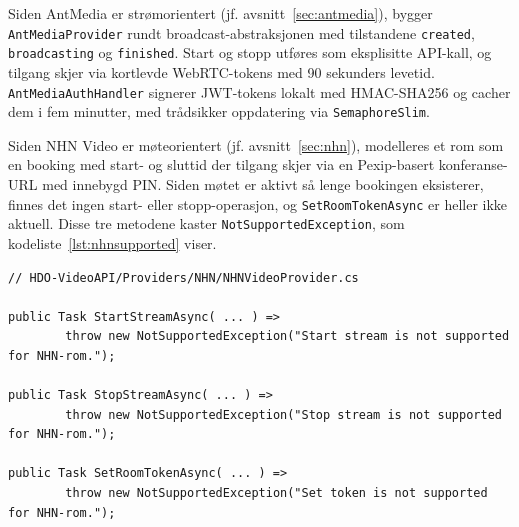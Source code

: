 

Siden AntMedia er strømorientert (jf. avsnitt~\ref{sec:antmedia}), bygger \texttt{AntMediaProvider} rundt broadcast-abstraksjonen med tilstandene \texttt{created}, \texttt{broadcasting} og \texttt{finished}. Start og stopp utføres som eksplisitte API-kall, og tilgang skjer via kortlevde WebRTC-tokens med 90 sekunders levetid. \texttt{AntMediaAuthHandler} signerer JWT-tokens lokalt med HMAC-SHA256 og cacher dem i fem minutter, med trådsikker oppdatering via \texttt{SemaphoreSlim}.

Siden NHN Video er møteorientert (jf. avsnitt~\ref{sec:nhn}), modelleres et rom som en booking med start- og sluttid der tilgang skjer via en Pexip-basert konferanse-URL med innebygd PIN. Siden møtet er aktivt så lenge bookingen eksisterer, finnes det ingen start- eller stopp-operasjon, og \texttt{SetRoomTokenAsync} er heller ikke aktuell. Disse tre metodene kaster \texttt{NotSupportedException}, som kodeliste~\ref{lst:nhnsupported} viser.

\begin{lstlisting}[language={[Sharp]C}, label=lst:nhnsupported,
  caption={Operasjoner uten semantisk ekvivalent i NHN Video.}]
// HDO-VideoAPI/Providers/NHN/NHNVideoProvider.cs

public Task StartStreamAsync( ... ) =>
        throw new NotSupportedException("Start stream is not supported for NHN-rom.");

public Task StopStreamAsync( ... ) =>
        throw new NotSupportedException("Stop stream is not supported for NHN-rom.");

public Task SetRoomTokenAsync( ... ) =>
        throw new NotSupportedException("Set token is not supported for NHN-rom.");
\end{lstlisting}

